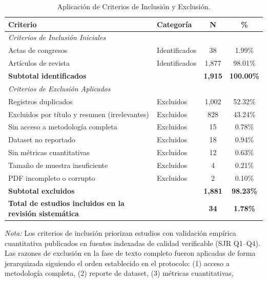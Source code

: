 \documentclass[3p,twocolumn,times]{elsarticle}
\begin{document}
	\begin{table}[!ht]
		\centering
		\caption{Aplicación de Criterios de Inclusión y Exclusión.}\label{tab3}
		\begin{tabular}{p{6cm}p{2.5cm}cc}
			\toprule
			\textbf{Criterio} & \textbf{Categoría} & \textbf{N} & \textbf{\%} \\
			\midrule
			\multicolumn{4}{l}{\textit{Criterios de Inclusión Iniciales}} \\
			Actas de congresos   & Identificados & 38      & 1.99\%   \\
			Artículos de revista & Identificados & 1{,}877 & 98.01\%  \\
			\textbf{Subtotal identificados} & & \textbf{1{,}915} & \textbf{100.00\%} \\
			\midrule
			\multicolumn{4}{l}{\textit{Criterios de Exclusión Aplicados}} \\
			Registros duplicados                          & Excluidos & 1{,}002 & 52.32\% \\
			Excluidos por título y resumen (irrelevantes) & Excluidos & 828     & 43.24\% \\
			Sin acceso a metodología completa             & Excluidos & 15      & 0.78\%  \\
			Dataset no reportado                          & Excluidos & 18      & 0.94\%  \\
			Sin métricas cuantitativas                    & Excluidos & 12      & 0.63\%  \\
			Tamaño de muestra insuficiente                & Excluidos & 4       & 0.21\%  \\
			PDF incompleto o corrupto                     & Excluidos & 2       & 0.10\%  \\
			\textbf{Subtotal excluidos} & & \textbf{1{,}881} & \textbf{98.23\%} \\
			\midrule
			\textbf{Total de estudios incluidos en la revisión sistemática} & & \textbf{34} & \textbf{1.78\%} \\
			\bottomrule
		\end{tabular}
		\begin{minipage}{\textwidth}
			\vspace{6pt}
			\small\textit{Nota:} Los criterios de inclusión priorizan estudios con validación
			empírica cuantitativa publicados en fuentes indexadas de calidad verificable (SJR
			Q1--Q4). Las razones de exclusión en la fase de texto completo fueron aplicadas
			de forma jerarquizada siguiendo el orden establecido en el protocolo: (1) acceso
			a metodología completa, (2) reporte de dataset, (3) métricas cuantitativas,

\end{minipage}
\end{table}
\end{document}
